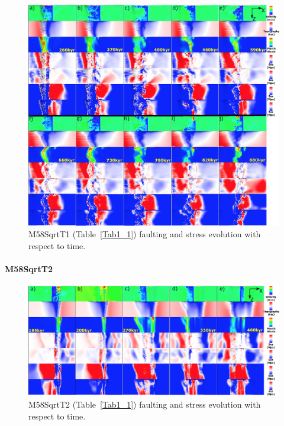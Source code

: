 \begin{figure}[h]
 \centering
  \includegraphics[width=1.0\textwidth]{./Figures/fig_Results_Weakening_7_M58SqrtT1_time_evolution.eps}
 \caption{M58SqrtT1 (Table~\hyperref[Tab1_1]{\ref{Tab1_1}}) faulting and stress evolution with respect to time.}
\label{fig_Results_Weakenging_7}
\end{figure}

\paragraph{M58SqrtT2} \label{para_M58SqrtT2}

\begin{figure}[h]
 \centering
  \includegraphics[width=1.0\textwidth]{./Figures/fig_Results_Weakening_8_M58SqrtT2_time_evolution.eps}
 \caption{M58SqrtT2 (Table~\hyperref[Tab1_1]{\ref{Tab1_1}}) faulting and stress evolution with respect to time.}
\label{fig_Results_Weakenging_8}
\end{figure}

